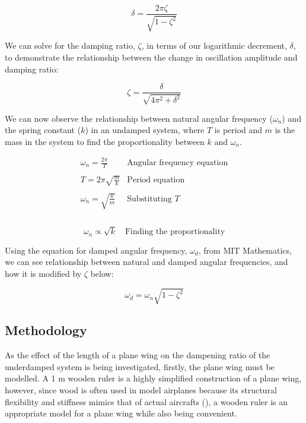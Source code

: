 \documentclass[12pt]{article}
\begin{document}
\begin{equation}
    \delta = \frac{2\pi\zeta}{\sqrt{1-\zeta^2}}
\end{equation}

We can solve for the damping ratio, $\zeta$, in terms of our logarithmic decrement, $\delta$, to demonstrate the relationship between the change in oscillation amplitude and damping ratio:

\begin{equation}\label{zeta in delta}
    \zeta = \frac{\delta}{\sqrt{4\pi^2+\delta^2}}
\end{equation}

We can now observe the relationship between natural angular frequency ($\omega_n$) and the spring constant ($k$) in an undamped system, where $T$ is period and $m$ is the mass in the system to find the proportionality between $k$ and $\omega_n$.

$$
\begin{array}{l|c}
    \omega_n = \frac{2\pi}{T} & \text{Angular frequency equation} \\ \\
    T = 2\pi \sqrt{\frac{m}{k}} & \text{Period equation} \\ \\
    \omega_n = \sqrt{\frac{k}{m}} & \text{Substituting } T \\ \\
 \end{array} 
$$

\begin{equation}\label{wnk}
    \boxed{\omega_n \propto \sqrt{k}}  \quad \text{Finding the proportionality}
\end{equation}

Using the equation for damped angular frequency, $
\omega_d$, from MIT Mathematics, we can see relationship between natural and damped angular frequencies, and how it is modified by $\zeta$ below:

\begin{equation}\label{wnwd}
    \omega_d = \omega_n\sqrt{1-\zeta^2}
\end{equation}

\subsection{Methodology}
As the effect of the length of a plane wing on the dampening ratio of the underdamped system is being investigated, firstly, the plane wing must be modelled. A 1 m wooden ruler is a highly simplified construction of a plane wing, however, since wood is often used in model airplanes because its structural flexibility and stiffness mimics that of actual aircrafts (\citeauthor{lacayo_2021}), a wooden ruler is an appropriate model for a plane wing while also being convenient. 
\end{document}
